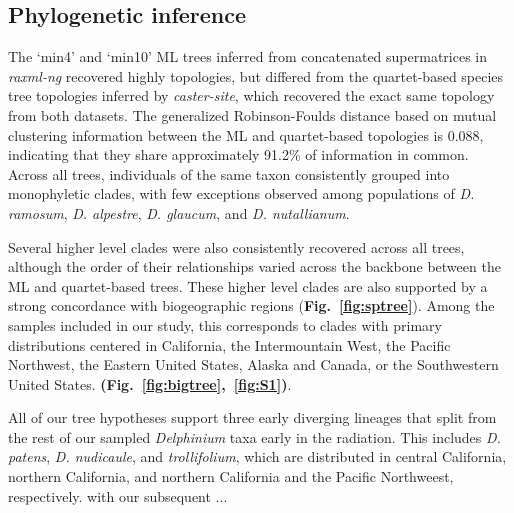 \documentclass[11pt]{article}
\begin{document}


\subsection{Phylogenetic inference}
The ‘min4’ and ‘min10’ ML trees inferred from concatenated supermatrices in
\emph{raxml-ng} recovered highly topologies, but differed from the quartet-based
species tree topologies inferred by \emph{caster-site}, which recovered the exact
same topology from both datasets. The generalized Robinson-Foulds distance based 
on mutual clustering information \citep[MCI;][]{smith_2020} between the ML and 
quartet-based topologies is 0.088, indicating that they share approximately 
91.2\% of information in common. 
% 
Across all trees, individuals of the same taxon consistently grouped into 
monophyletic clades, with few exceptions observed among populations of 
\emph{D. ramosum}, \emph{D. alpestre}, \emph{D. glaucum}, and \emph{D. nutallianum}.
% 



Several higher level clades were also consistently recovered across all 
trees, although the order of their relationships varied across the backbone 
between the ML and quartet-based trees.
% 
These higher level clades are also supported by a strong concordance with 
biogeographic regions ({\bf Fig.~\ref{fig:sptree}}). Among the samples included in
our study, this corresponds to clades with primary distributions centered
in California, the Intermountain West, the Pacific Northwest, the Eastern United
States, Alaska and Canada, or the Southwestern United States.
{\bf(Fig.~\ref{fig:bigtree},~\ref{fig:S1})}. 


All of our tree hypotheses support three early diverging lineages that split
from the rest of our sampled \emph{Delphinium} taxa early in the radiation. 
This includes \emph{D. patens}, \emph{D. nudicaule}, and \emph{trollifolium},
which are distributed in central California, northern California, and northern 
California and the Pacific Northweest, respectively. 
with our subsequent ...
\end{document}
